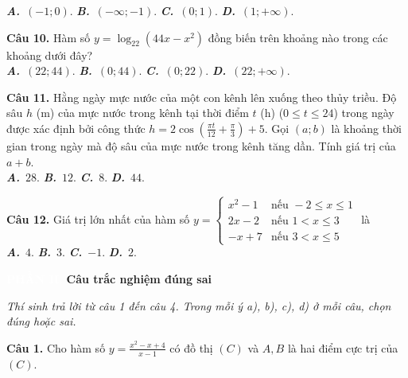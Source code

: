 \documentclass[12pt,a4paper]{article}
\newcommand{\myA}{\textcolor{myred}{\textbf{\textit{A.}}}}
\newcommand{\myB}{\textcolor{myred}{\textbf{\textit{B.}}}}
\newcommand{\myC}{\textcolor{myred}{\textbf{\textit{C.}}}}
\newcommand{\myD}{\textcolor{myred}{\textbf{\textit{D.}}}}
\begin{document}
	\vspace{0.1cm}
	\noindent
	\myA\ \((-1;0)\). \hfill \myB\ \((-\infty;-1)\). \hfill \myC\ \((0;1)\). \hfill \myD\ \((1;+\infty)\).
	
	\vspace{0.4cm}
	
	\noindent
	\textcolor{mypink}{\textbf{Câu 10.}} Hàm số \(y = \log_{22}(44x - x^2)\) đồng biến trên khoảng nào trong các khoảng dưới đây?\\
	\noindent
	\myA\ \((22; 44)\). \hfill \myB\ \((0; 44)\). \hfill \myC\ \((0; 22)\). \hfill \myD\ \((22; +\infty)\).
	
	\vspace{0.4cm}
	
	\noindent
	\textcolor{mypink}{\textbf{Câu 11.}} Hằng ngày mực nước của một con kênh lên xuống theo thủy triều. Độ sâu \(h\) (m) của mực nước trong kênh tại thời điểm \(t\) (h) (\(0 \le t \le 24\)) trong ngày được xác định bởi công thức \(h = 2\cos\left(\frac{\pi t}{12} + \frac{\pi}{3}\right) + 5\). Gọi \((a; b)\) là khoảng thời gian trong ngày mà độ sâu của mực nước trong kênh tăng dần. Tính giá trị của \(a + b\).\\
	\noindent
	\myA\ \(28\). \hfill \myB\ \(12\). \hfill \myC\ \(8\). \hfill \myD\ \(44\).
	
	\vspace{0.4cm}
	
	\noindent
	\textcolor{mypink}{\textbf{Câu 12.}} Giá trị lớn nhất của hàm số \(y = \begin{cases} x^2 - 1 & \text{nếu } -2 \le x \le 1 \\ 2x - 2 & \text{nếu } 1 < x \le 3 \\ -x + 7 & \text{nếu } 3 < x \le 5 \end{cases}\) là\\
	\noindent
	\myA\ \(4\). \hfill \myB\ \(3\). \hfill \myC\ \(-1\). \hfill \myD\ \(2\).
	
	\noindent
	\colorbox{mypink}{\textcolor{white}{\textbf{PHẦN II.}}} \textbf{\textcolor{mypink}{Câu trắc nghiệm đúng sai}}
	
	\noindent
	\textit{Thí sinh trả lời từ câu 1 đến câu 4. Trong mỗi ý a), b), c), d) ở mỗi câu, chọn đúng hoặc sai.}
	
	\vspace{0.4cm}
	
	\noindent
	\textcolor{mypink}{\textbf{Câu 1.}} Cho hàm số \(y = \frac{x^2-x+4}{x-1}\) có đồ thị \((C)\) và \(A, B\) là hai điểm cực trị của \((C)\).
	
\end{document}
